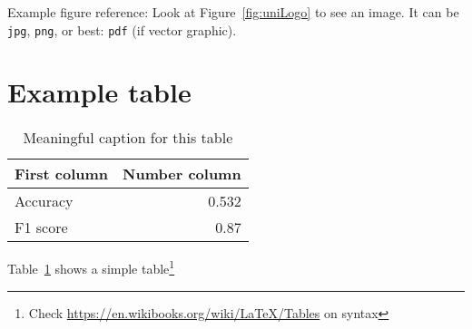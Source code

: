 Example figure reference: Look at Figure~\ref{fig:uniLogo} to see an image. It can be \texttt{jpg}, \texttt{png}, or best: \texttt{pdf} (if vector graphic).

\section{Example table}

\begin{table}
	\centering
	\begin{tabular}{lr}
		First column & Number column \\
		\hline
		Accuracy & 0.532 \\
		F1 score & 0.87
	\end{tabular}
	\caption{Meaningful caption for this table}
	\label{tab:result}
\end{table}

Table~\ref{tab:result} shows a simple table\footnote{Check \url{https://en.wikibooks.org/wiki/LaTeX/Tables} on syntax}